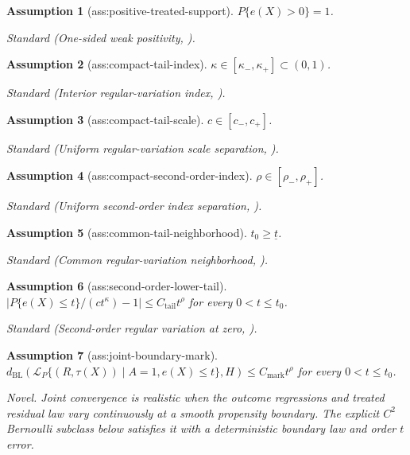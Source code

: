 \documentclass{article}
\newtheorem{assumption}{Assumption}
\begin{document}
\begin{assumption}[ass:positive-treated-support]\label{ass:positive-treated-support}
\(P\{e(X)>0\}=1\).
\par\smallskip\noindent\emph{Standard} (One-sided weak positivity, \cite{HeilerKazak2021Irregular}).
\end{assumption}

\begin{assumption}[ass:compact-tail-index]\label{ass:compact-tail-index}
\(\kappa\in[\kappa_-,\kappa_+]\subset(0,1)\).
\par\smallskip\noindent\emph{Standard} (Interior regular-variation index, \cite{MaWang2020RobustIPW}).
\end{assumption}

\begin{assumption}[ass:compact-tail-scale]\label{ass:compact-tail-scale}
\(c\in[c_-,c_+]\).
\par\smallskip\noindent\emph{Standard} (Uniform regular-variation scale separation, \cite{deHaanFerreira2006}).
\end{assumption}

\begin{assumption}[ass:compact-second-order-index]\label{ass:compact-second-order-index}
\(\rho\in[\rho_-,\rho_+]\).
\par\smallskip\noindent\emph{Standard} (Uniform second-order index separation, \cite{deHaanFerreira2006}).
\end{assumption}

\begin{assumption}[ass:common-tail-neighborhood]\label{ass:common-tail-neighborhood}
\(t_0\geq\underline t\).
\par\smallskip\noindent\emph{Standard} (Common regular-variation neighborhood, \cite{deHaanFerreira2006}).
\end{assumption}

\begin{assumption}[ass:second-order-lower-tail]\label{ass:second-order-lower-tail}
\(\left|P\{e(X)\leq t\}/(ct^{\kappa})-1\right|\leq C_{\mathrm{tail}}t^{\rho}\) for every \(0<t\leq t_0\).
\par\smallskip\noindent\emph{Standard} (Second-order regular variation at zero, \cite{deHaanFerreira2006}).
\end{assumption}

\begin{assumption}[ass:joint-boundary-mark]\label{ass:joint-boundary-mark}
\(d_{\mathrm{BL}}\!\left(\mathcal L_P\{(R,\tau(X))\mid A=1,e(X)\leq t\},H\right)\leq C_{\mathrm{mark}}t^{\rho}\) for every \(0<t\leq t_0\).
\par\smallskip\noindent\emph{Novel.} Joint convergence is realistic when the outcome regressions and treated residual law vary continuously at a smooth propensity boundary. The explicit \(C^2\) Bernoulli subclass below satisfies it with a deterministic boundary law and order \(t\) error.
\end{assumption}
\end{document}

